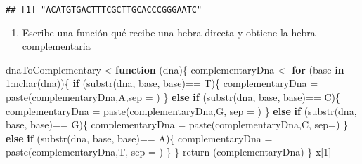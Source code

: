 \documentclass[
]{article}
\newenvironment{Shaded}{\begin{snugshade}}{\end{snugshade}}
\newcommand{\AttributeTok}[1]{\textcolor[rgb]{0.77,0.63,0.00}{#1}}
\newcommand{\ControlFlowTok}[1]{\textcolor[rgb]{0.13,0.29,0.53}{\textbf{#1}}}
\newcommand{\DecValTok}[1]{\textcolor[rgb]{0.00,0.00,0.81}{#1}}
\newcommand{\FunctionTok}[1]{\textcolor[rgb]{0.00,0.00,0.00}{#1}}
\newcommand{\NormalTok}[1]{#1}
\newcommand{\OtherTok}[1]{\textcolor[rgb]{0.56,0.35,0.01}{#1}}
\newcommand{\SpecialCharTok}[1]{\textcolor[rgb]{0.00,0.00,0.00}{#1}}
\newcommand{\StringTok}[1]{\textcolor[rgb]{0.31,0.60,0.02}{#1}}
\providecommand{\tightlist}{%
  \setlength{\itemsep}{0pt}\setlength{\parskip}{0pt}}
\begin{document}
\begin{verbatim}
## [1] "ACATGTGACTTTCGCTTGCACCCGGGAATC"
\end{verbatim}

\begin{enumerate}
\def\labelenumi{\arabic{enumi}.}
\setcounter{enumi}{6}
\tightlist
\item
  Escribe una función qué recibe una hebra directa y obtiene la hebra
  complementaria
\end{enumerate}

\begin{Shaded}
\begin{Highlighting}[]
\NormalTok{dnaToComplementary }\OtherTok{\textless{}{-}}\ControlFlowTok{function}\NormalTok{ (dna)\{}
\NormalTok{  complementaryDna }\OtherTok{\textless{}{-}}\StringTok{\textquotesingle{}\textquotesingle{}}
  \ControlFlowTok{for}\NormalTok{ (base }\ControlFlowTok{in} \DecValTok{1}\SpecialCharTok{:}\FunctionTok{nchar}\NormalTok{(dna))\{}
    \ControlFlowTok{if}\NormalTok{ (}\FunctionTok{substr}\NormalTok{(dna, base, base)}\SpecialCharTok{==} \StringTok{\textquotesingle{}T\textquotesingle{}}\NormalTok{)\{}
\NormalTok{      complementaryDna }\OtherTok{=} \FunctionTok{paste}\NormalTok{(complementaryDna,}\StringTok{\textquotesingle{}A\textquotesingle{}}\NormalTok{,}\AttributeTok{sep =} \StringTok{\textquotesingle{}\textquotesingle{}}\NormalTok{)}
\NormalTok{    \}}
    \ControlFlowTok{else} \ControlFlowTok{if}\NormalTok{ (}\FunctionTok{substr}\NormalTok{(dna, base, base)}\SpecialCharTok{==} \StringTok{\textquotesingle{}C\textquotesingle{}}\NormalTok{)\{}
\NormalTok{      complementaryDna }\OtherTok{=} \FunctionTok{paste}\NormalTok{(complementaryDna,}\StringTok{\textquotesingle{}G\textquotesingle{}}\NormalTok{, }\AttributeTok{sep =} \StringTok{\textquotesingle{}\textquotesingle{}}\NormalTok{)   }
\NormalTok{    \}}
   \ControlFlowTok{else} \ControlFlowTok{if}\NormalTok{ (}\FunctionTok{substr}\NormalTok{(dna, base, base)}\SpecialCharTok{==} \StringTok{\textquotesingle{}G\textquotesingle{}}\NormalTok{)\{}
\NormalTok{      complementaryDna }\OtherTok{=} \FunctionTok{paste}\NormalTok{(complementaryDna,}\StringTok{\textquotesingle{}C\textquotesingle{}}\NormalTok{, }\AttributeTok{sep=}\StringTok{\textquotesingle{}\textquotesingle{}}\NormalTok{)}
\NormalTok{    \}}
   \ControlFlowTok{else} \ControlFlowTok{if}\NormalTok{ (}\FunctionTok{substr}\NormalTok{(dna, base, base)}\SpecialCharTok{==} \StringTok{\textquotesingle{}A\textquotesingle{}}\NormalTok{)\{}
\NormalTok{      complementaryDna }\OtherTok{=} \FunctionTok{paste}\NormalTok{(complementaryDna,}\StringTok{\textquotesingle{}T\textquotesingle{}}\NormalTok{, }\AttributeTok{sep =} \StringTok{\textquotesingle{}\textquotesingle{}}\NormalTok{)   }
\NormalTok{    \}}
\NormalTok{  \}}
  \FunctionTok{return}\NormalTok{ (complementaryDna)}
\NormalTok{\}}
\NormalTok{x[}\DecValTok{1}\NormalTok{]}
\end{Highlighting}
\end{Shaded}
\end{document}
